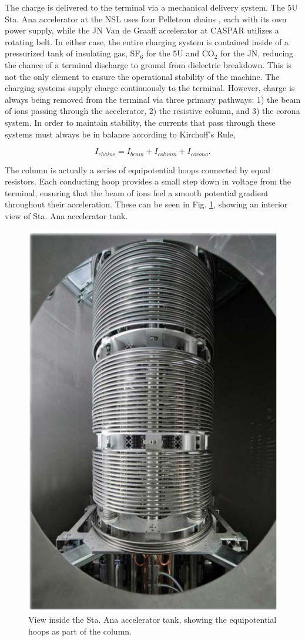The charge is delivered to the terminal via a mechanical delivery system. The 5U Sta. Ana accelerator at the NSL uses four Pelletron chains \cite{Herb1974}, each with its own power supply, while the JN Van de Graaff accelerator at CASPAR utilizes a rotating belt. In either case, the entire charging system is contained inside of a pressurized tank of insulating gas, SF$_{6}$ for the 5U and CO$_2$ for the JN, reducing the chance of a terminal discharge to ground from dielectric breakdown. This is not the only element to ensure the operational stability of the machine. The charging systems supply charge continuously to the terminal. However, charge is always being removed from the terminal via three primary pathways: 1) the beam of ions passing through the accelerator, 2) the resistive column, and 3) the corona system. In order to maintain stability, the currents that pass through these systems must always be in balance according to Kirchoff's Rule,

\begin{equation}
I_{chains} = I_{beam} + I_{column} + I_{corona}.
\end{equation}

\noindent The column is actually a series of equipotential hoops connected by equal resistors. Each conducting hoop provides a small step down in voltage from the terminal, ensuring that the beam of ions feel a smooth potential gradient throughout their acceleration. These can be seen in Fig. \ref{fig: column}, showing an interior view of Sta. Ana accelerator tank. 


\begin{figure}
\centering
\includegraphics[width=0.5\linewidth]{figures/inside5U.png}
\caption{View inside the Sta. Ana accelerator tank, showing the equipotential hoops as part of the column.}
\label{fig: column}
\end{figure}


